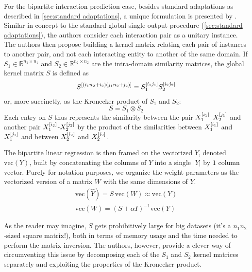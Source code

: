 For the bipartite interaction prediction case, besides standard adaptations as described in \autoref{sec:standard adaptations}, a unique formulation is presented by . Similar in concept to the standard global single output procedure (\autoref{sec:standard adaptations}), the authors consider each interaction pair as a unitary instance. The authors then propose building a kernel matrix relating each pair of instances to another pair, and not each interacting entity to another of the same domain. If $S_1 \in \mathbb{R}^{n_1 \times n_1}$ and $S_2 \in \mathbb{R}^{n_2 \times n_2}$ are the intra-domain similarity matrices, the global kernel matrix $S$ is defined as
%
\begin{equation}
    S^{[(i_1n_2 + i_2)(j_1 n_2 + j_2)]} = S_1^{[i_1j_1]} S_2^{[i_2j_2]}
\end{equation}
%
or, more succinctly, as the Kronecker product of $S_1$ and $S_2$:
%
\begin{equation}
    S = S_1 \otimes S_2
\end{equation}
%
Each entry on $S$ thus represents the similarity between the pair $X_1^{[i_1]}$-$X_2^{[j_1]}$ and another pair $X_1^{[i_2]}$-$X_2^{[j_2]}$ by the product of the similarities between $X_1^{[i_1]}$ and $X_1^{[j_1]}$ and between $X_2^{[i_2]}$ and $X_2^{[j_2]}$.

The bipartite linear regression is then framed on the vectorized $Y$, denoted $\text{vec}(Y)$, built by concatenating the columns of $Y$ into a single $|Y|$ by $1$ column vector.
Purely for notation purposes, we organize the weight parameters as the vectorized version of a matrix $W$ with the same dimensions of $Y$.
%
\begin{gather}
    \text{vec}(\hat Y) = S\,\text{vec}(W) \approx \text{vec}(Y)
    \\
    \text{vec}(W) = (S + \alpha I)^{-1} \text{vec}(Y)
\end{gather}

As the reader may imagine, $S$ gets prohibitively large for big datasets (it's a $n_1 n_2$-sized square matrix!), both in terms of memory usage and the time needed to perform the matrix inversion. The authors, however, provide a clever way of circumventing this issue by decomposing each of the $S_1$ and $S_2$ kernel matrices separately and exploiting the properties of the Kronecker product.

